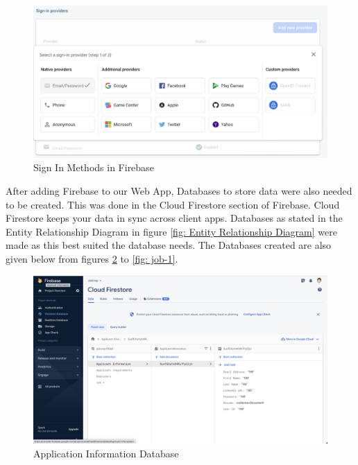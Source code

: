 \begin{figure}
    \centering
    \includegraphics[width = 140mm]{Figures/sign-in-methods.png}
    \caption{Sign In Methods in Firebase}
    \label{fig:sign-in-methods}
\end{figure}

After adding Firebase to our Web App, Databases to store data were also needed to be created. This was done in the Cloud Firestore section of Firebase. Cloud Firestore keeps your data in sync across client apps. Databases as stated in the Entity Relationship Diagram in figure \ref{fig: Entity Relationship Diagram} were made as this best suited the database needs. The Databases created are also given below from figures \ref{fig: app-information} to \ref{fig: job-1}.

\begin{figure}
    \centering
    \includegraphics[width = 140mm]{Figures/app-information.png}
    \caption{Application Information Database}
    \label{fig: app-information}
\end{figure}

